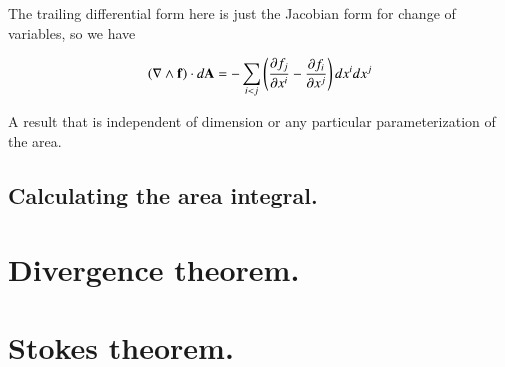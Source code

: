 \documentclass{article}
\newcommand{\grad}[0]{\nabla}
\newcommand{\PD}[2]{\frac{\partial {#2}}{\partial {#1}}}
\begin{document}
The trailing differential form here is just the Jacobian form for change of variables, so we have

\begin{align}
\left(\grad \wedge \Bf\right) \cdot d\BA
= -\sum_{i<j} \left( \PD{x^{i}}{f_j} -\PD{x^{j}}{f_i} \right) dx^i dx^j
\end{align}

A result that is independent of dimension or any particular parameterization of the area.

\subsection{ Calculating the area integral. }

\section{ Divergence theorem. }

\section{ Stokes theorem. }
\end{document}
